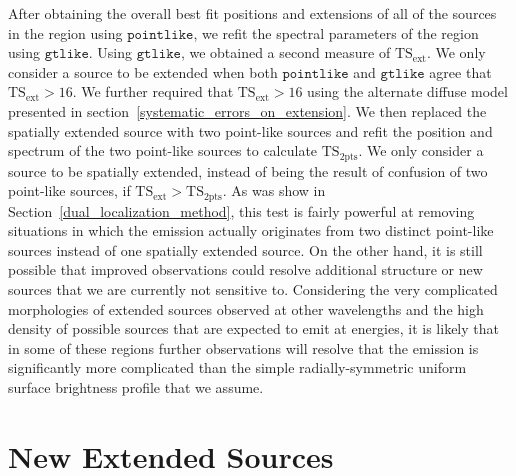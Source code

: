 \documentclass[12pt,preprint]{aastex}
\newcommand{\gev}{\text{GeV}\xspace}
\newcommand{\tsext}{{\ensuremath{\text{TS}_{\text{ext}}}}\xspace}
\newcommand{\tsinc}{\ensuremath{\text{TS}_{\text{2pts}}}\xspace}
\newcommand{\gtlike}{\ensuremath{\mathtt{gtlike}}\xspace}
\newcommand{\pointlike}{\ensuremath{\mathtt{pointlike}}\xspace}
\begin{document}
After obtaining the overall best fit positions and extensions of all
of the sources in the region using \pointlike, we refit the spectral
parameters of the region using \gtlike.  Using \gtlike, we obtained a
second measure of \tsext.  We only consider a source to be extended when
both \pointlike and \gtlike agree that $\tsext>16$. 
We further required that $\tsext>16$ using the alternate diffuse
model presented in section~\ref{systematic_errors_on_extension}.
We then replaced the spatially extended source with two point-like
sources and refit the position and spectrum of the
two point-like sources to calculate \tsinc.
We only consider a source to be spatially extended, instead of being
the result of confusion of two point-like sources, if $\tsext>\tsinc$.
As was show in Section~\ref{dual_localization_method}, this test is
fairly powerful at removing situations in which the emission actually
originates from two distinct point-like sources instead of one spatially
extended source.  On the other hand, it is still possible that improved
observations could resolve additional structure or new sources that we are
currently not sensitive to. Considering the very complicated morphologies
of extended sources observed at other wavelengths and the high density
of possible sources that are expected to emit at \gev energies, it is
likely that in some of these regions further observations will resolve
that the emission is significantly more complicated than the simple
radially-symmetric uniform surface brightness profile that we assume.


\section{New Extended Sources}
\label{new_ext_srcs_section}


\end{document}
